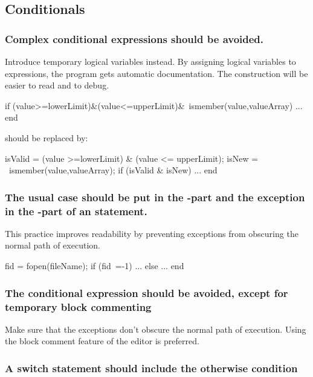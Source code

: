 \documentclass[titlepage,a4paper,12pt]{article}
\begin{document}
\subsection{Conditionals}

\subsubsection{Complex conditional expressions should be avoided.}

 Introduce
temporary logical variables instead. By assigning logical variables
to expressions, the program gets automatic documentation. The
construction will be easier to read and to debug.
\begin{verbmcode}
if (value>=lowerLimit)&(value<=upperLimit)&~ismember(value,valueArray)
    ...
end
\end{verbmcode}
should be replaced by:
\begin{verbmcode}
isValid = (value >=lowerLimit) & (value <= upperLimit);
isNew = ~ismember(value,valueArray);
if (isValid & isNew)
    ...
end
\end{verbmcode}

\subsubsection{The usual case should be put in the -part and the exception in the
-part of an  statement.}

 This practice improves
readability by preventing exceptions from obscuring the normal path
of execution.
\begin{verbmcode}
fid = fopen(fileName);
if (fid~=-1)
 ...
else
 ...
end
\end{verbmcode}

\subsubsection{The
conditional expression  should be avoided, except for temporary
block commenting}

 Make sure that the exceptions don't obscure the
normal path of execution. Using the block comment feature of the
editor is preferred.

\subsubsection{A switch statement should include the otherwise
condition}
\end{document}
